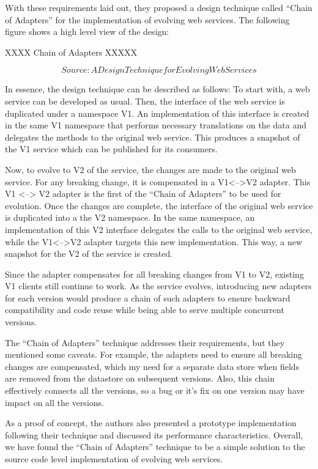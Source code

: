 \documentclass[runningheads,a4paper]{llncs}
\begin{document}
With these requirements laid out, they proposed a design technique called ``Chain of Adapters'' for the implementation of evolving web services. The following figure shows a high level view of the design:

XXXX Chain of Adapters XXXXX

\[Source: A Design Technique for Evolving Web Services \]

In essence, the design technique can be described as follows: To start with, a web service can be developed as usual. Then, the interface of the web service is duplicated under a namespace V1. An implementation of this interface is created in the same V1 namespace that performs necessary translations on the data and delegates the methods to the original web service. This produces a snapshot of the V1 service which can be published for its consumers.

Now, to evolve to V2 of the service, the changes are made to the original web service. For any breaking change, it is compensated in a V1<-->V2 adapter. This V1 <--> V2 adapter is the first of the ``Chain of Adapters'' to be used for evolution. Once the changes are complete, the interface of the original web service is duplicated into a the V2 namespace. In the same namespace, an implementation of this V2 interface delegates the calls to the original web service, while the V1<-->V2 adapter targets this new implementation. This way, a new snapshot for the V2 of the service is created.

Since the adapter compensates for all breaking changes from V1 to V2, existing V1 clients still continue to work. As the service evolves, introducing new adapters for each version would produce a chain of such adapters to ensure backward compatibility and code reuse while being able to serve multiple concurrent versions.

The ``Chain of Adapters'' technique addresses their requirements, but they mentioned some caveats. For example, the adapters need to ensure all breaking changes are compensated, which my need for a separate data store when fields are removed from the datastore on subsequent versions. Also, this chain effectively connects all the versions, so a bug or it’s fix on one version may have impact on all the versions.

As a proof of concept, the authors also presented a prototype implementation following their technique and discussed its performance characteristics. Overall, we have found the ``Chain of Adapters'' technique to be a simple solution to the source code level implementation of evolving web services.
\end{document}
